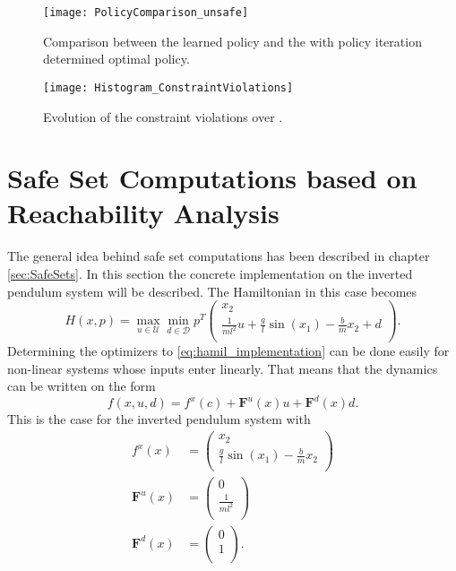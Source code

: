 \documentclass[../main.tex]{subfiles}
\begin{document}
\begin{figure}[h]
    \centering
    \texttt{[image: PolicyComparison\_unsafe]}
        \caption{Comparison between the learned policy and the with policy iteration determined optimal policy.}    
    \label{fig:PolicyComparison_unsafe}
\end{figure}
\begin{figure}[h]
    \centering
    \texttt{[image: Histogram\_ConstraintViolations]}
        \caption{Evolution of the constraint violations over .}    
    \label{fig:Histogram_ConstraintViolations}
\end{figure}

\section{Safe Set Computations based on Reachability Analysis}
The general idea behind safe set computations has been described in chapter \ref{sec:SafeSets}. In this section the concrete implementation on the inverted pendulum system will be described. The Hamiltonian in this case becomes 
\begin{equation}\label{eq:hamil_implementation}
    H(x,p) = \max_{u \in \mathcal{U}} \min_{d \in \mathcal{D}} p^T 
\left(
\begin{array}{c}
x_2\\
\frac{1}{ml^2}u+\frac{g}{l}\sin(x_1)-\frac{b}{m}x_2+d\\
\end{array}
\right).
\end{equation}
Determining the optimizers to \eqref{eq:hamil_implementation} can be done easily for non-linear systems whose inputs enter linearly. That means that the dynamics can be written on the form
\begin{equation}
    f(x,u,d) = f^x(c)+\textbf{F}^u(x)u+\textbf{F}^d(x)d.
\end{equation}
This is the case for the inverted pendulum system with
\begin{align}
    f^x(x) &= \left(
\begin{array}{c}
x_2\\
\frac{g}{l}\sin(x_1)-\frac{b}{m}x_2\\
\end{array}
\right)\\
    \textbf{F}^u(x) &= \left(
\begin{array}{c}
0\\
\frac{1}{ml^2}\\
\end{array}
\right)\\
    \textbf{F}^d(x) &= \left(
    \begin{array}{c}
0\\
1\\
\end{array}
\right).
\end{align}
\end{document}
